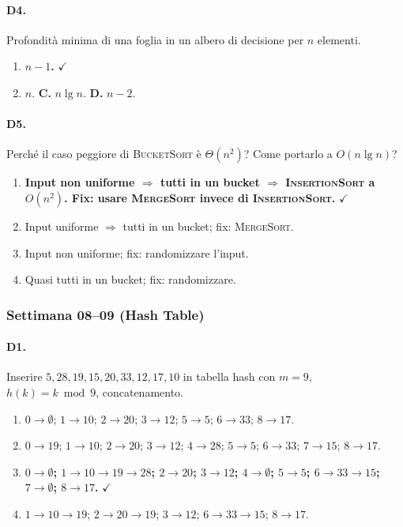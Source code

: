 \paragraph{D4.} Profondit\`a minima di una foglia in un albero di decisione per $n$ elementi.
\begin{enumerate}[label=\Alph*.,leftmargin=*]
	\item \textcolor{correctgreen}{\textbf{$n-1$.}} \hfill\textcolor{correctgreen}{$\checkmark$}
	\item $n$. \quad\textbf{C.} $n\lg n$. \quad\textbf{D.} $n-2$.
\end{enumerate}

\paragraph{D5.} Perch\'e il caso peggiore di \textsc{BucketSort} \`e $\Theta(n^2)$? Come portarlo a $O(n\lg n)$?
\begin{enumerate}[label=\Alph*.,leftmargin=*]
	\item \textcolor{correctgreen}{\textbf{Input non uniforme $\Rightarrow$ tutti in un bucket $\Rightarrow$ \textsc{InsertionSort} a $O(n^2)$. Fix: usare \textsc{MergeSort} invece di \textsc{InsertionSort}.}} \hfill\textcolor{correctgreen}{$\checkmark$}
	\item Input uniforme $\Rightarrow$ tutti in un bucket; fix: \textsc{MergeSort}.
	\item Input non uniforme; fix: randomizzare l'input.
	\item Quasi tutti in un bucket; fix: randomizzare.
\end{enumerate}

\subsubsection{Settimana 08--09 (Hash Table)}

\paragraph{D1.} Inserire $5,28,19,15,20,33,12,17,10$ in tabella hash con $m=9$, $h(k)=k\bmod 9$, concatenamento.
\begin{enumerate}[label=\Alph*.,leftmargin=*]
	\item $0{\to}\emptyset$; $1{\to}10$; $2{\to}20$; $3{\to}12$; $5{\to}5$; $6{\to}33$; $8{\to}17$.
	\item $0{\to}19$; $1{\to}10$; $2{\to}20$; $3{\to}12$; $4{\to}28$; $5{\to}5$; $6{\to}33$; $7{\to}15$; $8{\to}17$.
	\item \textcolor{correctgreen}{\textbf{$0{\to}\emptyset$; $1{\to}10{\to}19{\to}28$; $2{\to}20$; $3{\to}12$; $4{\to}\emptyset$; $5{\to}5$; $6{\to}33{\to}15$; $7{\to}\emptyset$; $8{\to}17$.}} \hfill\textcolor{correctgreen}{$\checkmark$}
	\item $1{\to}10{\to}19$; $2{\to}20{\to}19$; $3{\to}12$; $6{\to}33{\to}15$; $8{\to}17$.
\end{enumerate}

